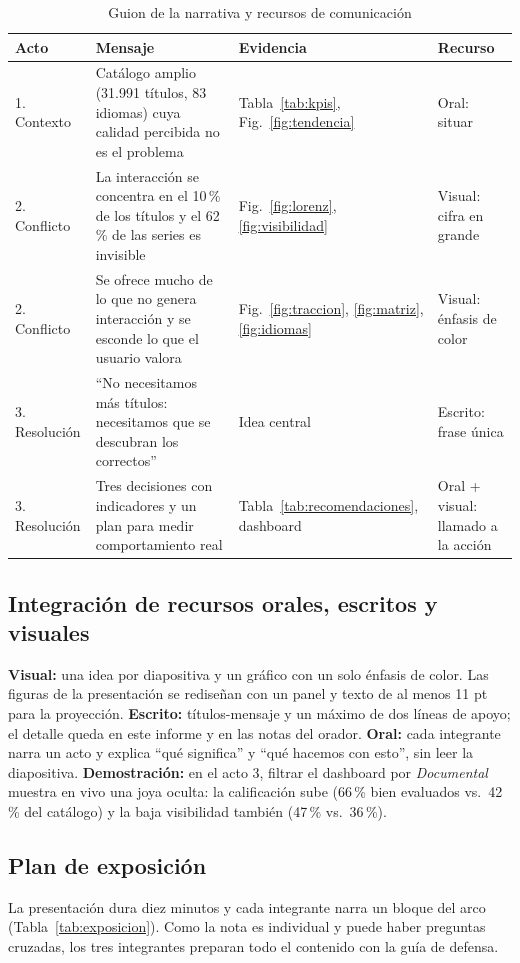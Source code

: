 \documentclass[conference,a4paper]{IEEEtran}
\begin{document}
\begin{table}[!t]
\caption{Guion de la narrativa y recursos de comunicación}
\label{tab:actos}
\centering\footnotesize
\begin{tabularx}{\columnwidth}{@{}P{1.3cm}LP{1.3cm}P{1.4cm}@{}}
\toprule
Acto & Mensaje & Evidencia & Recurso\\
. Contexto & Catálogo amplio (31.991 títulos, 83 idiomas) cuya calidad percibida no es el problema & Tabla~\ref{tab:kpis}, Fig.~\ref{fig:tendencia} & Oral: situar\\
2. Conflicto & La interacción se concentra en el 10\,\% de los títulos y el 62\,\% de las series es invisible & Fig.~\ref{fig:lorenz}, \ref{fig:visibilidad} & Visual: cifra en grande\\
2. Conflicto & Se ofrece mucho de lo que no genera interacción y se esconde lo que el usuario valora & Fig.~\ref{fig:traccion}, \ref{fig:matriz}, \ref{fig:idiomas} & Visual: énfasis de color\\
3. Resolución & ``No necesitamos más títulos: necesitamos que se descubran los correctos'' & Idea central & Escrito: frase única\\
3. Resolución & Tres decisiones con indicadores y un plan para medir comportamiento real & Tabla~\ref{tab:recomendaciones}, dashboard & Oral + visual: llamado a la acción\\
\bottomrule
\end{tabularx}
\end{table}

\subsection{Integración de recursos orales, escritos y visuales}
\textbf{Visual:} una idea por diapositiva y un gráfico con un solo énfasis de color. Las figuras de la presentación se rediseñan con un panel y texto de al menos 11 pt para la proyección. \textbf{Escrito:} títulos-mensaje y un máximo de dos líneas de apoyo; el detalle queda en este informe y en las notas del orador. \textbf{Oral:} cada integrante narra un acto y explica ``qué significa'' y ``qué hacemos con esto'', sin leer la diapositiva. \textbf{Demostración:} en el acto 3, filtrar el dashboard por \emph{Documental} muestra en vivo una joya oculta: la calificación sube (66\,\% bien evaluados vs.\ 42\,\% del catálogo) y la baja visibilidad también (47\,\% vs.\ 36\,\%).

\subsection{Plan de exposición}
La presentación dura diez minutos y cada integrante narra un bloque del arco (Tabla~\ref{tab:exposicion}). Como la nota es individual y puede haber preguntas cruzadas, los tres integrantes preparan todo el contenido con la guía de defensa.
\end{document}
